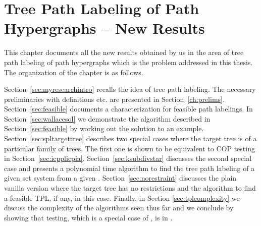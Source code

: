\xclearpage

\chapter[Tree Path Labeling]{Tree Path Labeling of Path
  Hypergraphs -- New Results}
\label{ch:myresearch}

This chapter documents all the new results obtained by us in the area
of tree path labeling of path hypergraphs which is the problem
addressed in this thesis. The organization of the chapter is as
follows.

Section~\ref{sec:myresearchintro} recalls the idea of tree path
labeling. The necessary preliminaries with definitions etc. are
presented in Section~\ref{ch:prelims}. Section~\ref{sec:feasible}
documents a characterization for feasible path labelings. In
Section~\ref{sec:wallacesol} we demonstrate the algorithm described in
Section~\ref{sec:feasible} by working out the solution to an example.
Section~\ref{sec:spltargettree} describes two special cases where the
target tree is of a particular family of trees. The first one is shown
to be equivalent to COP testing in
Section~\ref{sec:icpplicpia}. Section~\ref{sec:ksubdivstar} discusses
the second special case and presents a polynomial time algorithm to
find the tree path labeling of a given set system from a given
\kstar. Section~\ref{sec:norestraint} discusses the plain vanilla
version where the target tree has no restrictions and the algorithm to
find a feasible TPL, if any, in this case.  Finally, in Section
\ref{sec:tplcomplexity} we discuss the complexity of the algorithms
seen thus far and we conclude by showing that \cop testing, which is a
special case of \TPL, is in \logspace.

